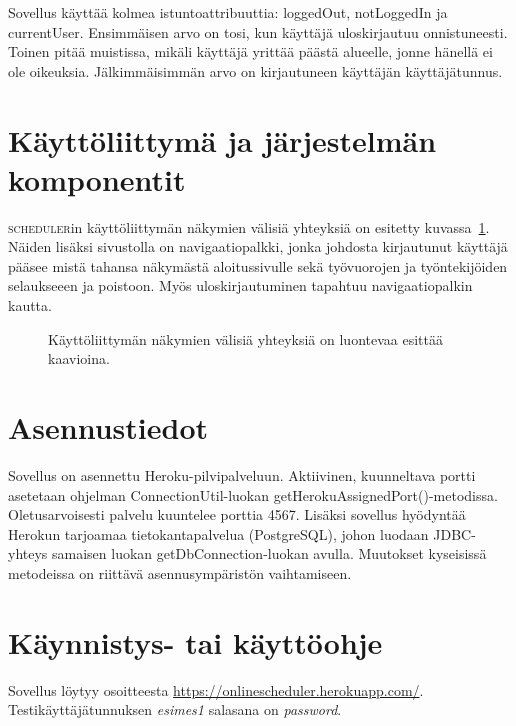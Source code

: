 \documentclass[10pt,titlepage,hidelinks]{scrartcl}
\newcommand{\scheduler}{\textsc{scheduler}}
\begin{document}
Sovellus käyttää kolmea istuntoattribuuttia: loggedOut, notLoggedIn ja currentUser. Ensimmäisen arvo on tosi, kun käyttäjä uloskirjautuu onnistuneesti. Toinen pitää muistissa, mikäli käyttäjä yrittää päästä alueelle, jonne hänellä ei ole oikeuksia. Jälkimmäisimmän arvo on kirjautuneen käyttäjän käyttäjätunnus.

\section{Käyttöliittymä ja järjestelmän komponentit}

\scheduler{}in käyttöliittymän näkymien välisiä yhteyksiä on esitetty kuvassa~\ref{fig:nakymat}. Näiden lisäksi sivustolla on navigaatiopalkki, jonka johdosta kirjautunut käyttäjä pääsee mistä tahansa näkymästä aloitussivulle sekä työvuorojen ja työntekijöiden selaukseeen ja poistoon. Myös uloskirjautuminen tapahtuu navigaatiopalkin kautta.

\begin{figure}[tb]
\centering
{}
\caption{Käyttöliittymän näkymien välisiä yhteyksiä on luontevaa esittää kaavioina.}
\label{fig:nakymat}
\end{figure}

\section{Asennustiedot}

Sovellus on asennettu Heroku-pilvipalveluun. Aktiivinen, kuunneltava portti asetetaan ohjelman ConnectionUtil-luokan getHerokuAssignedPort()-metodissa. Oletusarvoisesti palvelu kuuntelee porttia 4567. Lisäksi sovellus hyödyntää Herokun tarjoamaa tietokantapalvelua (PostgreSQL), johon luodaan JDBC-yhteys samaisen luokan getDbConnection-luokan avulla. Muutokset kyseisissä metodeissa on riittävä asennusympäristön vaihtamiseen.

\section{Käynnistys- tai käyttöohje}
Sovellus löytyy osoitteesta \url{https://onlinescheduler.herokuapp.com/}. Testikäyttäjätunnuksen \emph{esimes1} salasana on \emph{password}.
\end{document}
